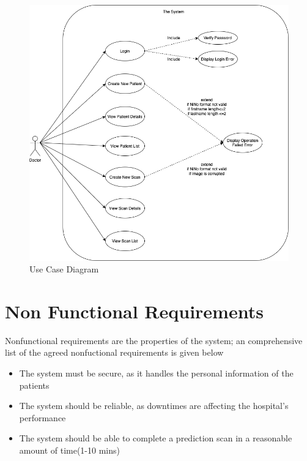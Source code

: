 			\begin{figure}[H]
				\iftrue
				\centering
				\caption{Use Case Diagram}
				\includegraphics[scale=0.5]{figures/use-case}
				\fi
			\end{figure}
	\section{Non Functional Requirements}
		\label{non-functional-requirements}
		Nonfunctional requirements are the properties of the system; an comprehensive list of the agreed nonfuctional requirements is given below
		\begin{itemize}
			\item The system must be secure, as it handles the personal information of the patients
			\item The system should be reliable, as downtimes are affecting the hospital's performance 
			\item The system should be able to complete a prediction scan in a reasonable amount of time(1-10 mins)
		\end{itemize}
		


